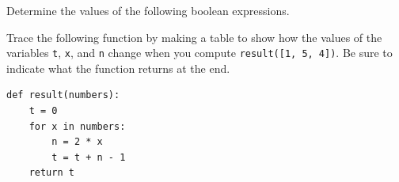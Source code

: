 \documentclass[12pt]{exam}
\begin{document}
\begin{questions}
\question[8] Determine the values of the following boolean expressions. 


\question[10] Trace the following function by making a table to show how the values of the variables \lstinline{t}, \lstinline{x}, and \lstinline{n} change when you compute \lstinline{result([1, 5, 4])}.  Be sure to indicate what the function returns at the end.


\begin{lstlisting}
def result(numbers):
    t = 0
    for x in numbers:
        n = 2 * x
        t = t + n - 1
    return t
\end{lstlisting}

\vspace*{2.5in}
\vfill
\end{questions}
\end{document}
